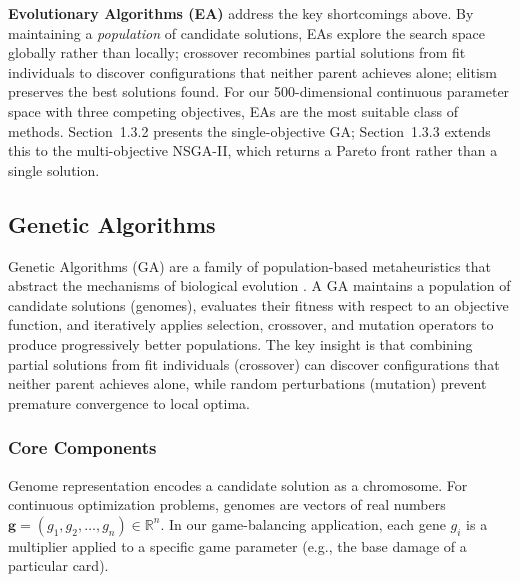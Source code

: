 \textbf{Evolutionary Algorithms (EA)} address the key shortcomings above. By maintaining a \emph{population} of candidate solutions, EAs explore the search space globally rather than locally; crossover recombines partial solutions from fit individuals to discover configurations that neither parent achieves alone; elitism preserves the best solutions found. For our 500-dimensional continuous parameter space with three competing objectives, EAs are the most suitable class of methods. Section~1.3.2 presents the single-objective GA; Section~1.3.3 extends this to the multi-objective NSGA-II, which returns a Pareto front rather than a single solution.

\subsection{Genetic Algorithms}

Genetic Algorithms (GA) are a family of population-based metaheuristics that abstract the mechanisms of biological evolution \cite{holland1992adaptation}. A GA maintains a population of candidate solutions (genomes), evaluates their fitness with respect to an objective function, and iteratively applies selection, crossover, and mutation operators to produce progressively better populations. The key insight is that combining partial solutions from fit individuals (crossover) can discover configurations that neither parent achieves alone, while random perturbations (mutation) prevent premature convergence to local optima.

\subsubsection{Core Components}

Genome representation encodes a candidate solution as a chromosome. For continuous optimization problems, genomes are vectors of real numbers $\mathbf{g} = (g_1, g_2, \ldots, g_n) \in \mathbb{R}^n$. In our game-balancing application, each gene $g_i$ is a multiplier applied to a specific game parameter (e.g., the base damage of a particular card).

